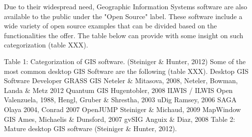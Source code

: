Due to their widespread need, Geographic Information Systems software are also available to the public under the "Open Source" label. These software include a wide variety of open source examples that can be divided based on the functionalities the offer. The table below can provide with some insight on such categorization (table XXX).  

Table 1: Categorization of GIS software. (Steiniger \& Hunter, 2012)
Some of the most common desktop GIS Software are the following (table XXX).
Desktop GIS Software
Developer
GRASS GIS
Neteler \& Mitasova, 2008, Neteler, Bowman, Landa \& Metz 2012
Quantum GIS
Hugentobler, 2008
ILWIS / ILWIS Open
Valenzuela, 1988, Hengl, Gruber \& Shrestha, 2003
uDig
Ramsey, 2006
SAGA
Olaya 2004, Conrad 2007
OpenJUMP
Steiniger \& Michaud, 2009
MapWindow GIS
Ames, Michaelis \& Dunsford, 2007
gvSIG
Anguix \& Diaz, 2008
Table 2: Mature desktop GIS software (Steiniger \& Hunter, 2012).